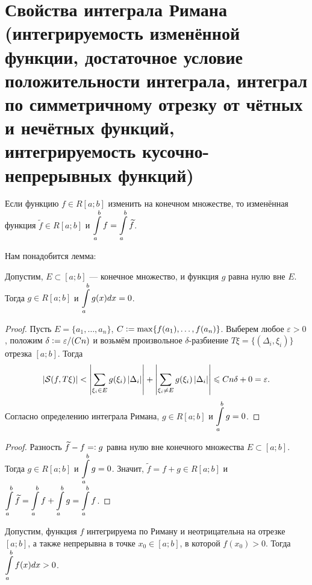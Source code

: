\section{Свойства интеграла Римана (интегрируемость изменённой функции, достаточное условие положительности интеграла, интеграл по симметричному отрезку от чётных и нечётных функций, интегрируемость кусочно-непрерывных функций)}

\begin{theorem}
    Если функцию $f \in R[a; b]$ изменить на конечном множестве, то изменённая функция $\widetilde{f} \in R[a; b]$ и $\displaystyle\int\limits_a^bf = \int\limits_a^b\widetilde{f}$.
\end{theorem}

Нам понадобится лемма:

\begin{lemma}
    Допустим, $E \subset [a; b]$ --- конечное множество, и функция $g$ равна нулю вне $E$. Тогда $g \in R[a; b]$ и $\displaystyle\int\limits_a^bg(x)dx = 0$.
\end{lemma}

\begin{proof}
    Пусть $E = \{a_1, \ldots, a_n\}$, $C \vcentcolon = \max\{f(a_1), \ldots, f(a_n)\}$. Выберем любое $\varepsilon > 0$, положим $\delta \vcentcolon = \varepsilon / (Cn)$ и возьмём произвольное $\delta$-разбиение $T\xi = \{(\Delta_i, \xi_i)\}$ отрезка $[a; b]$. Тогда
    \[
        \left\lvert\mathcal{S}(f, T\xi)\right\rvert < \left\lvert\sum_{\xi_i \in E}g(\xi_i)\left\lvert\Delta_i\right\rvert\right\rvert + \left\lvert\sum_{\xi_i \ne E}g(\xi_i)\left\lvert\Delta_i\right\rvert\right\rvert \leqslant Cn\delta + 0 = \varepsilon.
    \]
    Согласно определению интеграла Римана, $g \in R[a; b]$ и $\displaystyle\int\limits_a^bg = 0$.
\end{proof}

\begin{proof}
    Разность $\widetilde{f} - f = \vcentcolon g$ равна нулю вне конечного множества $E \subset [a; b]$. Тогда $g \in R[a; b]$ и $\displaystyle\int\limits_a^bg = 0$. Значит, $\widetilde{f} = f + g \in R[a; b]$ и $\displaystyle\int\limits_a^b\widetilde{f} = \int\limits_a^bf + \int\limits_a^bg = \int\limits_a^bf$.
\end{proof}

\begin{theorem}
    Допустим, функция $f$ интегрируема по Риману и неотрицательна на отрезке $[a; b]$, а также непрерывна в точке $x_0 \in [a; b]$, в которой $f(x_0) > 0$. Тогда $\displaystyle\int\limits_a^bf(x)dx > 0$.
\end{theorem}

